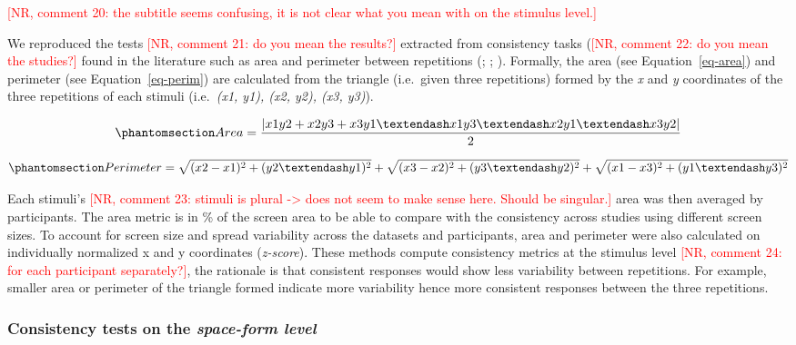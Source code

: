 \documentclass[
  man,
  longtable,
  a4paper,
  nolmodern,
  notxfonts,
  notimes,
  colorlinks=true,linkcolor=blue,citecolor=blue,urlcolor=blue]{apa7}
\begin{document}
\textcolor{red}{[NR, comment 20: the subtitle seems confusing, it is not clear what you mean with on the stimulus level.]}

We reproduced the tests
\textcolor{red}{[NR, comment 21: do you mean the results?]} extracted
from consistency tasks
(\textcolor{red}{[NR, comment 22: do you mean the studies?]} found in
the literature such as area and perimeter between repetitions
(;
;
). Formally, the area (see
Equation~\ref{eq-area}) and perimeter (see Equation~\ref{eq-perim}) are
calculated from the triangle (i.e.~given three repetitions) formed by
the \emph{x} and \emph{y} coordinates of the three repetitions of each
stimuli (i.e.~\emph{(x1, y1), (x2, y2), (x3, y3)}).

\begin{equation}\phantomsection\label{eq-area}{
Area = \frac{|x1y2 +x2y3 + x3y1 – x1y3 – x2y1 – x3y2|}{2}
}\end{equation}

\begin{equation}\phantomsection\label{eq-perim}{
Perimeter = \sqrt{(x2 - x1)^2 + (y2 – y1)^2} + \sqrt{(x3 - x2)^2 + (y3 –y2)^2} + \sqrt{(x1 - x3)^2 + (y1 – y3)^2}
}\end{equation}

Each stimuli's
\textcolor{red}{[NR, comment 23: stimuli is plural -> does not seem to make sense here. Should be singular.]}
area was then averaged by participants. The area metric is in \% of the
screen area to be able to compare with the consistency across studies
using different screen sizes. To account for screen size and spread
variability across the datasets and participants, area and perimeter
were also calculated on individually normalized x and y coordinates
(\emph{z-score}). These methods compute consistency metrics at the
stimulus level
\textcolor{red}{[NR, comment 24: for each participant separately?]}, the
rationale is that consistent responses would show less variability
between repetitions. For example, smaller area or perimeter of the
triangle formed indicate more variability hence more consistent
responses between the three repetitions.

\subsubsection{\texorpdfstring{Consistency tests on the \emph{space-form
level}}{Consistency tests on the space-form level}}\label{consistency-tests-on-the-space-form-level}
\end{document}

